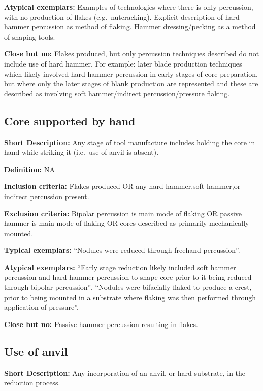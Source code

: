 \documentclass[
]{article}
\begin{document}
\textbf{Atypical exemplars:} Examples of technologies where there is
only percussion, with no production of flakes (e.g.~nutcracking).
Explicit description of hard hammer percussion as method of flaking.
Hammer dressing/pecking as a method of shaping tools.

\textbf{Close but no:} Flakes produced, but only percussion techniques
described do not include use of hard hammer. For example: later blade
production techniques which likely involved hard hammer percussion in
early stages of core preparation, but where only the later stages of
blank production are represented and these are described as involving
soft hammer/indirect percussion/pressure flaking.

\hypertarget{core-supported-by-hand}{%
\subsection{Core supported by hand}\label{core-supported-by-hand}}

\textbf{Short Description:} Any stage of tool manufacture includes
holding the core in hand while striking it (i.e.~use of anvil is
absent).

\textbf{Definition:} NA

\textbf{Inclusion criteria:} Flakes produced OR any hard hammer,soft
hammer,or indirect percussion present.

\textbf{Exclusion criteria:} Bipolar percussion is main mode of flaking
OR passive hammer is main mode of flaking OR cores described as
primarily mechanically mounted.

\textbf{Typical exemplars:} ``Nodules were reduced through freehand
percussion''.

\textbf{Atypical exemplars:} ``Early stage reduction likely included
soft hammer percussion and hard hammer percussion to shape core prior to
it being reduced through bipolar percussion'', ``Nodules were bifacially
flaked to produce a crest, prior to being mounted in a substrate where
flaking was then performed through application of pressure''.

\textbf{Close but no:} Passive hammer percussion resulting in flakes.

\hypertarget{use-of-anvil}{%
\subsection{Use of anvil}\label{use-of-anvil}}

\textbf{Short Description:} Any incorporation of an anvil, or hard
substrate, in the reduction process.
\end{document}
